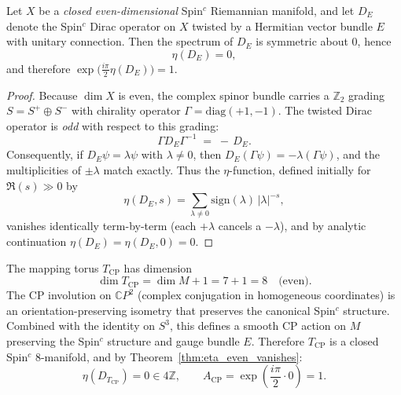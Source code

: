 \begin{theorem}\label{thm:eta_even_vanishes}
Let $X$ be a \emph{closed even-dimensional} Spin$^c$ Riemannian manifold, and let
$D_E$ denote the Spin$^c$ Dirac operator on $X$ twisted by a Hermitian vector bundle $E$ with unitary connection.
Then the spectrum of $D_E$ is symmetric about $0$, hence
\begin{equation}
\eta(D_E)=0,
\end{equation}
and therefore $\exp\!\bigl(\tfrac{i\pi}{2}\eta(D_E)\bigr)=1$.
\end{theorem}

\begin{proof}
Because $\dim X$ is even, the complex spinor bundle carries a $\mathbb{Z}_2$ grading
$S=S^+\oplus S^-$ with chirality operator $\Gamma=\mathrm{diag}(+1,-1)$.
The twisted Dirac operator is \emph{odd} with respect to this grading:
\begin{equation}
\Gamma D_E \Gamma^{-1} \;=\; -\,D_E.
\label{eq:L_chirality_odd}
\end{equation}
Consequently, if $D_E\psi=\lambda\psi$ with $\lambda\neq 0$, then
$D_E(\Gamma\psi)= -\lambda(\Gamma\psi)$, and the multiplicities of $\pm\lambda$ match exactly.
Thus the $\eta$-function, defined initially for $\Re(s)\gg 0$ by
\begin{equation}
\eta(D_E,s)=\sum_{\lambda\neq 0}\mathrm{sign}(\lambda)\,|\lambda|^{-s},
\end{equation}
vanishes identically term-by-term (each $+\lambda$ cancels a $-\lambda$), and by analytic continuation $\eta(D_E)=\eta(D_E,0)=0$.
\end{proof}

\begin{corollary}\label{cor:DFD_ACP_trivial}
The mapping torus $T_{\mathrm{CP}}$ has dimension
\begin{equation}
\dim T_{\mathrm{CP}} = \dim M + 1 = 7 + 1 = 8 \quad\text{(even)}.
\end{equation}
The CP involution on $\mathbb{C}P^2$ (complex conjugation in homogeneous coordinates) is an orientation-preserving isometry that preserves the canonical Spin$^c$ structure. Combined with the identity on $S^3$, this defines a smooth CP action on $M$ preserving the Spin$^c$ structure and gauge bundle $E$.
Therefore $T_{\mathrm{CP}}$ is a closed Spin$^c$ 8-manifold, and by Theorem~\ref{thm:eta_even_vanishes}:
\begin{equation}
\eta(D_{T_{\mathrm{CP}}})=0 \in 4\mathbb{Z},
\qquad
A_{\mathrm{CP}}=\exp\!\left(\frac{i\pi}{2}\cdot 0\right)=1.
\end{equation}
\end{corollary}

